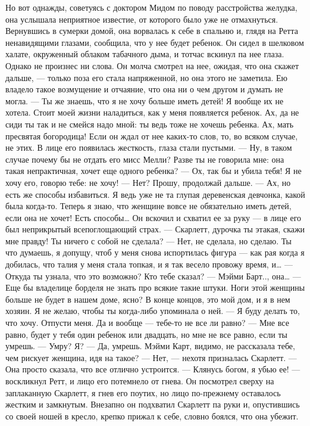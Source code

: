 Но вот однажды, советуясь с доктором Мидом по поводу расстройства желудка, она услышала неприятное известие, от которого было уже не отмахнуться. Вернувшись в сумерки домой, она ворвалась к себе в спальню и, глядя на Ретта ненавидящими глазами, сообщила, что у нее будет ребенок.
Он сидел в шелковом халате, окруженный облаком табачного дыма, и тотчас вскинул па нее глаза. Однако не произнес ни слова. Он молча смотрел на нее, ожидая, что она скажет дальше, — только поза его стала напряженной, но она этого не заметила. Ею владело такое возмущение и отчаяние, что она ни о чем другом и думать не могла.
— Ты же знаешь, что я не хочу больше иметь детей! Я вообще их не хотела. Стоит моей жизни наладиться, как у меня появляется ребенок. Ах, да не сиди ты так и не смейся надо мной: ты ведь тоже не хочешь ребенка. Ах, мать пресвятая богородица!
Если он ждал от нее каких-то слов, то, во всяком случае, не этих. В лице его появилась жесткость, глаза стали пустыми.
— Ну, в таком случае почему бы не отдать его мисс Мелли? Разве ты не говорила мне: она такая непрактичная, хочет еще одного ребенка?
— Ох, так бы и убила тебя! Я не хочу его, говорю тебе: не хочу!
— Нет? Прошу, продолжай дальше.
— Ах, но есть же способы избавиться. Я ведь уже не та глупая деревенская девчонка, какой была когда-то. Теперь я знаю, что женщине вовсе не обязательно иметь детей, если она не хочет! Есть способы…
Он вскочил и схватил ее за руку — в лице его был неприкрытый всепоглощающий страх.
— Скарлетт, дурочка ты этакая, скажи мне правду! Ты ничего с собой не сделала?
— Нет, не сделала, но сделаю. Ты что думаешь, я допущу, чтоб у меня снова испортилась фигура — как рая когда я добилась, что талия у меня стала топкая, и я так весело провожу время, и…
— Откуда ты узнала, что это возможно? Кто тебе сказал?
— Мэйми Барт.., она…
— Еще бы владелице борделя не знать про всякие такие штуки. Ноги этой женщины больше не будет в нашем доме, ясно? В конце концов, это мой дом, и я в нем хозяин. Я не желаю, чтобы ты когда-либо упоминала о ней.
— Я буду делать то, что хочу. Отпусти меня. Да и вообще — тебе-то не все ли равно?
— Мне все равно, будет у тебя один ребенок или двадцать, но мне не все равно, если ты умрешь.
— Умру? Я?
— Да, умрешь. Мэйми Карт, видимо, не рассказала тебе, чем рискует женщина, идя на такое?
— Нет, — нехотя призналась Скарлетт. — Она просто сказала, что все отлично устроится.
— Клянусь богом, я убью ее! — воскликнул Ретт, и лицо его потемнело от гнева. Он посмотрел сверху на заплаканную Скарлетт, я гнев его поутих, но лицо по-прежнему оставалось жестким и замкнутым. Внезапно он подхватил Скарлетт па руки и, опустившись со своей ношей в кресло, крепко прижал к себе, словно боялся, что она убежит.
